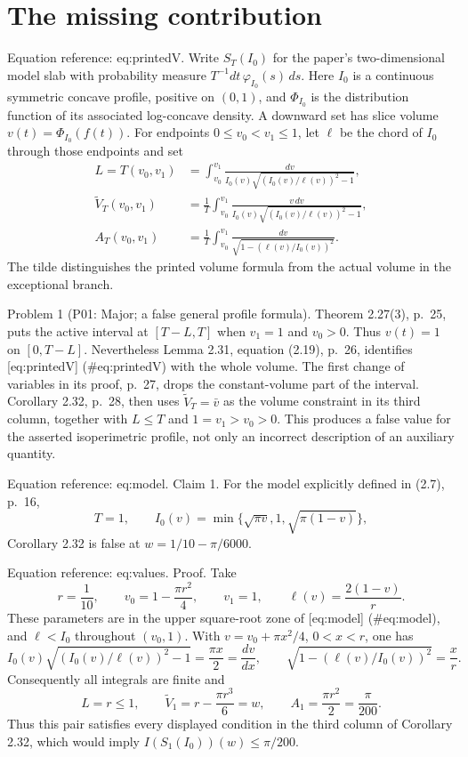 \documentclass[10pt]{article}
\begin{document}
\section*{The missing contribution}
Equation reference: eq:printedV. Write \(S_T(I_0)\) for the paper’s two-dimensional model slab with probability measure \(T^{-1}dt\,\varphi_{I_0}(s)\,ds\). Here \(I_0\) is a continuous symmetric concave profile, positive on \((0,1)\), and \(\Phi_{I_0}\) is the distribution function of its associated log-concave density. A downward set has slice volume \(v(t)=\Phi_{I_0}(f(t))\). For endpoints \(0\leq v_0<v_1\leq1\), let \(\ell\) be the chord of \(I_0\) through those endpoints and set \[\begin{aligned}
 L=T(v_0,v_1)
 &=\int_{v_0}^{v_1}
 \frac{dv}{I_0(v)\sqrt{(I_0(v)/\ell(v))^2-1}},\\
 \widetilde V_T(v_0,v_1)
 &=\frac1T\int_{v_0}^{v_1}
 \frac{v\,dv}{I_0(v)\sqrt{(I_0(v)/\ell(v))^2-1}},\\
 A_T(v_0,v_1)
 &=\frac1T\int_{v_0}^{v_1}
 \frac{dv}{\sqrt{1-(\ell(v)/I_0(v))^2}}.\end{aligned}\] The tilde distinguishes the printed volume formula from the actual volume in the exceptional branch.\par
Problem 1 (P01: Major; a false general profile formula).  Theorem 2.27(3), p. 25, puts the active interval at \([T-L,T]\) when \(v_1=1\) and \(v_0>0\). Thus \(v(t)=1\) on \([0,T-L]\). Nevertheless Lemma 2.31, equation (2.19), p. 26, identifies [eq:printedV] (\#eq:printedV) with the whole volume. The first change of variables in its proof, p. 27, drops the constant-volume part of the interval. Corollary 2.32, p. 28, then uses \(\widetilde V_T=\bar v\) as the volume constraint in its third column, together with \(L\leq T\) and \(1=v_1>v_0>0\). This produces a false value for the asserted isoperimetric profile, not only an incorrect description of an auxiliary quantity.\par
Equation reference: eq:model. Claim 1.  For the model explicitly defined in (2.7), p. 16, \[
 T=1,\qquad I_0(v)=\min\{\sqrt{\pi v},1,\sqrt{\pi(1-v)}\},\] Corollary 2.32 is false at \(w=1/10-\pi/6000\).\par
Equation reference: eq:values. Proof. Take \[r=\frac1{10},\qquad v_0=1-\frac{\pi r^2}{4},\qquad
 v_1=1,\qquad \ell(v)=\frac{2(1-v)}r.\] These parameters are in the upper square-root zone of [eq:model] (\#eq:model), and \(\ell<I_0\) throughout \((v_0,1)\). With \(v=v_0+\pi x^2/4\), \(0<x<r\), one has \[I_0(v)\sqrt{(I_0(v)/\ell(v))^2-1}=\frac{\pi x}{2}
 =\frac{dv}{dx},\qquad
 \sqrt{1-(\ell(v)/I_0(v))^2}=\frac{x}{r}.\] Consequently all integrals are finite and \[
 L=r\leq1,\qquad
 \widetilde V_1=r-\frac{\pi r^3}{6}=w,\qquad
 A_1=\frac{\pi r^2}{2}=\frac{\pi}{200}.\] Thus this pair satisfies every displayed condition in the third column of Corollary 2.32, which would imply \(I(S_1(I_0))(w)\leq\pi/200\).\par
\end{document}
